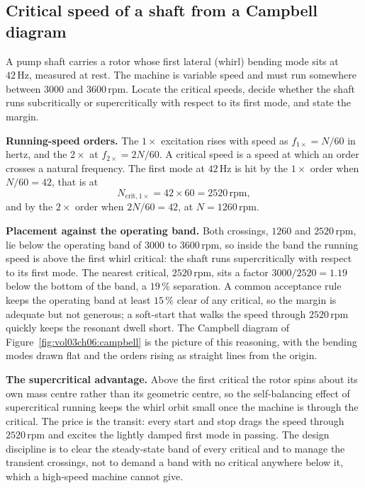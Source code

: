 \subsection{Critical speed of a shaft from a Campbell diagram}

A pump shaft carries a rotor whose first lateral (whirl) bending mode
sits at $42\,\si{\hertz}$, measured at rest. The machine is variable
speed and must run somewhere between $3000$ and $3600\,\text{rpm}$.
Locate the critical speeds, decide whether the shaft runs subcritically
or supercritically with respect to its first mode, and state the margin.

\textbf{Running-speed orders.} The $1\times$ excitation rises with
speed as $f_{1\times} = N/60$ in hertz, and the $2\times$ at
$f_{2\times} = 2N/60$. A critical speed is a speed at which an order
crosses a natural frequency. The first mode at $42\,\si{\hertz}$ is hit
by the $1\times$ order when $N/60 = 42$, that is at
\[
N_{\text{crit},1\times} = 42\times 60 = 2520\,\text{rpm},
\]
and by the $2\times$ order when $2N/60 = 42$, at $N = 1260\,\text{rpm}$.

\textbf{Placement against the operating band.} Both crossings,
$1260$ and $2520\,\text{rpm}$, lie below the operating band of $3000$ to
$3600\,\text{rpm}$, so inside the band the running speed is above the
first whirl critical: the shaft runs supercritically with respect to
its first mode. The nearest critical, $2520\,\text{rpm}$, sits a factor
$3000/2520 = 1.19$ below the bottom of the band, a $19\,\%$ separation.
A common acceptance rule keeps the operating band at least $15\,\%$
clear of any critical, so the margin is adequate but not generous; a
soft-start that walks the speed through $2520\,\text{rpm}$ quickly keeps
the resonant dwell short. The Campbell diagram of
Figure~\ref{fig:vol03ch06:campbell} is the picture of this reasoning,
with the bending modes drawn flat and the orders rising as straight
lines from the origin.



\textbf{The supercritical advantage.} Above the first critical the rotor
spins about its own mass centre rather than its geometric centre, so the
self-balancing effect of supercritical running keeps the whirl orbit
small once the machine is through the critical. The price is the
transit: every start and stop drags the speed through $2520\,\text{rpm}$
and excites the lightly damped first mode in passing. The design
discipline is to clear the steady-state band of every critical and to
manage the transient crossings, not to demand a band with no critical
anywhere below it, which a high-speed machine cannot give.

